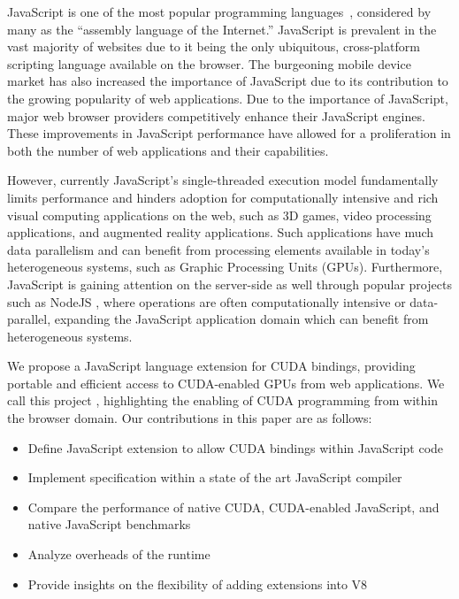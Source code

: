 JavaScript is one of the most popular programming languages~\cite{top10}, 
considered by many as the ``assembly language of the Internet.'' JavaScript is
prevalent in the vast majority of websites due to it being the only
ubiquitous, cross-platform scripting language available on the browser. The 
burgeoning mobile device market has also increased the importance of JavaScript due
to its contribution to the growing  popularity of web applications.
Due to the importance of JavaScript, major web browser providers competitively
enhance their JavaScript engines. These improvements in JavaScript performance
have allowed for a proliferation in both the number of web applications and
their capabilities.  

However, currently JavaScript's single-threaded execution model fundamentally limits
performance and hinders adoption for computationally intensive and rich visual
computing applications on the web, such as 3D games, video processing
applications, and augmented reality applications. Such applications have much data
parallelism and can benefit from processing elements available in today’s
heterogeneous systems, such as Graphic Processing Units (GPUs).  Furthermore,
JavaScript is gaining attention on the server-side as well through popular
projects such as NodeJS \cite{nodeJS}, where operations are often
computationally intensive or data-parallel, expanding the JavaScript application
domain which can benefit from heterogeneous systems.

We propose a JavaScript language extension for CUDA bindings, providing portable
and efficient access to CUDA-enabled GPUs from web applications.  We call this
project \namens, highlighting the enabling of CUDA programming from within the
browser domain. Our contributions in this paper are as follows:


\begin{itemize}

\item Define JavaScript extension to allow CUDA bindings within JavaScript code
\item Implement \name specification within a state of the art JavaScript compiler
\item Compare the performance of native CUDA, CUDA-enabled JavaScript, and native JavaScript benchmarks
\item Analyze overheads of the \name runtime
\item Provide insights on the flexibility of adding extensions into V8

\end{itemize}

